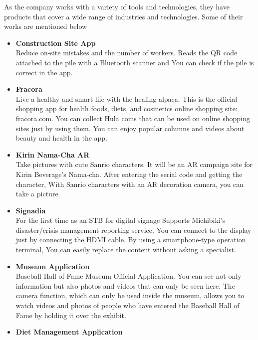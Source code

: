 \begin{flushleft}
\vspace{9pt}
As the company works with a variety of tools and technologies, they have products that
cover a wide range of industries and technologies. Some of their works are mentioned
below \\
\vspace{10pt}
\begin{itemize}
    \item \textbf{Construction Site App}\\
     \vspace{6pt}
Reduce on-site mistakes and the number of workers. Reads the QR code attached to
the pile with a Bluetooth scanner and You can check if the pile is correct in the app.
 \item \textbf{Fracora}\\
  \vspace{6pt}
Live a healthy and smart life with the healing alpaca. This is the official shopping app for
health foods, diets, and cosmetics online shopping site: fracora.com. You can collect
Hula coins that can be used on online shopping sites just by using them. You can enjoy
popular columns and videos about beauty and health in the app.
 \item \textbf{Kirin Nama-Cha AR}\\
  \vspace{6pt}
Take pictures with cute Sanrio characters. It will be an AR campaign site for Kirin
Beverage's Nama-cha. After entering the serial code and getting the character, With
Sanrio characters with an AR decoration camera, you can take a picture.
 \item \textbf{Signadia}\\
  \vspace{6pt}
For the first time as an STB for digital signage Supports Michibiki's disaster/crisis
management reporting service. You can connect to the display just by connecting the
HDMI cable. By using a smartphone-type operation terminal, You can easily replace the
content without asking a specialist.
 \item \textbf{Museum Application}\\
  \vspace{6pt}
Baseball Hall of Fame Museum Official Application. You can see not only information but
also photos and videos that can only be seen here. The camera function, which can only
be used inside the museum, allows you to watch videos and photos of people who have
entered the Baseball Hall of Fame by holding it over the exhibit.
 \item \textbf{Diet Management Application}\\

\end{itemize}
\end{flushleft}

